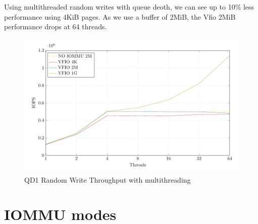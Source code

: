 Using multithreaded random writes with queue deoth, we can see up to 10\% less performance using 4KiB pages. As we use a buffer of 2MiB, the Vfio 2MiB performance drops at 64 threads.

\begin{figure}
    \centering
    \includegraphics[width=\textwidth]{figures/qd1tnrandwrite}
    \caption{QD1 Random Write Throughput with multithreading}
    \label{fig:qd1tn}
\end{figure}



\section{IOMMU modes}